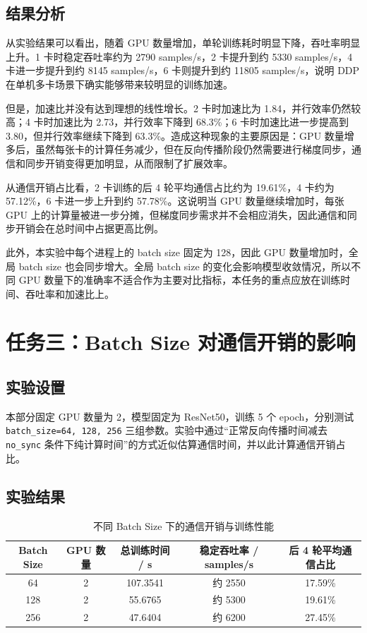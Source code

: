 \documentclass{article}
\begin{document}
\subsection{结果分析}
从实验结果可以看出，随着 GPU 数量增加，单轮训练耗时明显下降，吞吐率明显上升。1 卡时稳定吞吐率约为 2790 samples/s，2 卡提升到约 5330 samples/s，4 卡进一步提升到约 8145 samples/s，6 卡则提升到约 11805 samples/s，说明 DDP 在单机多卡场景下确实能够带来较明显的训练加速。

但是，加速比并没有达到理想的线性增长。2 卡时加速比为 1.84，并行效率仍然较高；4 卡时加速比为 2.73，并行效率下降到 68.3\%；6 卡时加速比进一步提高到 3.80，但并行效率继续下降到 63.3\%。造成这种现象的主要原因是：GPU 数量增多后，虽然每张卡的计算任务减少，但在反向传播阶段仍然需要进行梯度同步，通信和同步开销变得更加明显，从而限制了扩展效率。

从通信开销占比看，2 卡训练的后 4 轮平均通信占比约为 19.61\%，4 卡约为 57.12\%，6 卡进一步上升到约 57.78\%。这说明当 GPU 数量继续增加时，每张 GPU 上的计算量被进一步分摊，但梯度同步需求并不会相应消失，因此通信和同步开销会在总时间中占据更高比例。

此外，本实验中每个进程上的 batch size 固定为 128，因此 GPU 数量增加时，全局 batch size 也会同步增大。全局 batch size 的变化会影响模型收敛情况，所以不同 GPU 数量下的准确率不适合作为主要对比指标，本任务的重点应放在训练时间、吞吐率和加速比上。

\section{任务三：Batch Size 对通信开销的影响}
\subsection{实验设置}
本部分固定 GPU 数量为 2，模型固定为 ResNet50，训练 5 个 epoch，分别测试 \texttt{batch\_size=64, 128, 256} 三组参数。实验中通过“正常反向传播时间减去 \texttt{no\_sync} 条件下纯计算时间”的方式近似估算通信时间，并以此计算通信开销占比。

\subsection{实验结果}
\begin{table}[H]
  \centering
  \caption{不同 Batch Size 下的通信开销与训练性能}
  \label{tab:batch_size_result}
  \begin{tabular}{ccccc}
    \toprule
    Batch Size & GPU 数量 & 总训练时间 / s & 稳定吞吐率 / samples/s & 后 4 轮平均通信占比 \\
    \midrule
    64 & 2 & 107.3541 & 约 2550 & 17.59\% \\
    128 & 2 & 55.6765 & 约 5300 & 19.61\% \\
    256 & 2 & 47.6404 & 约 6200 & 27.45\% \\
    \bottomrule
  \end{tabular}
\end{table}
\end{document}
